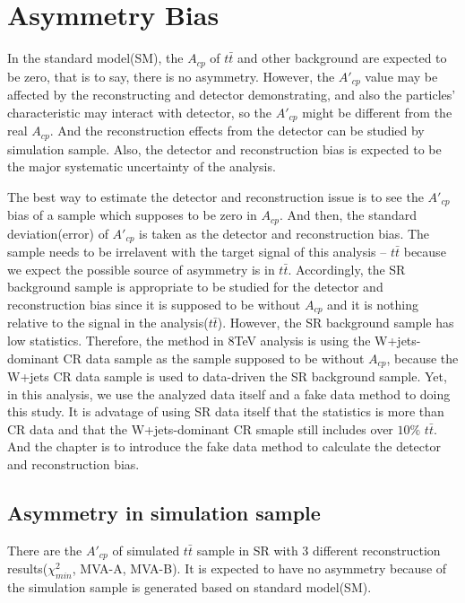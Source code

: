 

\section{Asymmetry Bias}
\label{sec:AsymBias}

	In the standard model(SM), the $A_{cp}$ of $t\bar{t}$ and other background are expected to be zero, that is to say, there is no asymmetry. However, the $A'_{cp}$ value may be affected by the reconstructing and detector demonstrating, and also the particles' characteristic may interact with detector, so the $A'_{cp}$ might be different from the real $A_{cp}$. And the reconstruction effects from the detector can be studied by simulation sample. Also, the detector and reconstruction bias is expected to be the major systematic uncertainty of the analysis.

	The best way to estimate the detector and reconstruction issue is to see the $A'_{cp}$ bias of a sample which supposes to be zero in $A_{cp}$. And then, the standard deviation(error) of $A'_{cp}$ is taken as the detector and reconstruction bias. The sample needs to be irrelavent with the target signal of this analysis -- $t\bar{t}$ because we expect the possible source of asymmetry is in $t\bar{t}$. Accordingly, the SR background sample is appropriate to be studied for the detector and reconstruction bias since it is supposed to be without $A_{cp}$ and it is nothing relative to the signal in the analysis($t\bar{t}$). However, the SR background sample has low statistics. Therefore, the method in 8TeV analysis is using the W+jets-dominant CR data sample as the sample supposed to be without $A_{cp}$, because the W+jets CR data sample is used to data-driven the SR background sample. Yet, in this analysis, we use the analyzed data itself and a fake data method to doing this study. It is advatage of using SR data itself that the statistics is more than CR data and that the W+jets-dominant CR smaple still includes over $10\%$ $t\bar{t}$. And the chapter is to introduce the fake data method to calculate the detector and reconstruction bias.

	\subsection{Asymmetry in simulation sample}
	\label{ssec:Asym_in_sim}

		There are the $A'_{cp}$ of simulated $t\bar{t}$ sample in SR with 3 different reconstruction results($\chi^2_{min}$, MVA-A, MVA-B). It is expected to have no asymmetry because of the simulation sample is generated based on standard model(SM).


